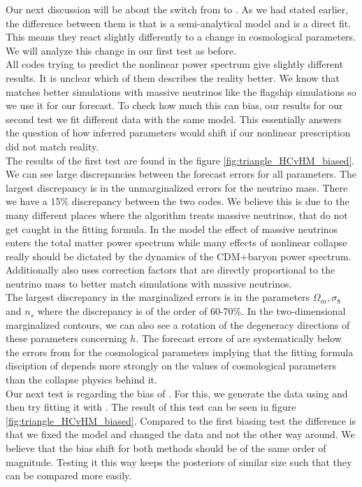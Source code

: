 \documentclass[../main.tex]{subfiles}
\begin{document}
\noindent Our next discussion will be about the switch from \halofit to \hmcode. As we had stated earlier, the difference between them is that \hmcode is a semi-analytical model and \halofit is a direct fit. This means they react slightly differently to a change in cosmological parameters. We will analyze this change in our first test as before.\\
All codes trying to predict the nonlinear power spectrum give slightly different results. It is unclear which of them describes the reality better. We know that \hmcode matches better simulations with massive neutrinos like the \Euclid flagship simulations so we use it for our forecast. To check how much this can bias, our results for our second test we fit different data with the same model. This essentially answers the question of how inferred parameters would shift if our nonlinear prescription did not match reality.\\
The results of the first test are found in the figure \ref{fig:triangle_HCvHM_biased}. We can see large discrepancies between the forecast errors for all parameters. The largest discrepancy is in the unmarginalized errors for the neutrino mass. There we have a  15\% discrepancy between the two codes. We believe this is due to the many different places where the \hmcode algorithm treats massive neutrinos, that do not get caught in the \halofit fitting formula. In the \halofit model the effect of massive neutrinos enters the total matter power spectrum while many effects of nonlinear collapse really should be dictated by the dynamics of the CDM+baryon power spectrum. Additionally \hmcode also uses correction factors that are directly proportional to the neutrino mass to better match simulations with massive neutrinos.\\
The largest discrepancy in the marginalized errors is in the parameters $\Omega_m,\sigma_8$ and $n_s$ where the discrepancy is of the order of 60-70\%. In the two-dimensional marginalized contours, we can also see a rotation of the degeneracy directions of these parameters concerning $h$. The forecast errors of \halofit are systematically below the errors from \hmcode for the cosmological parameters implying that the fitting formula disciption of \halofit depends more strongly on the values of cosmological parameters than the collapse physics behind it.\\
Our next test is regarding the bias of \hmcode. For this, we generate the data using \halofit and then try fitting it with \hmcode. The result of this test can be seen in figure \ref{fig:triangle_HCvHM_biased}. Compared to the first biasing test the difference is that we fixed the model and changed the data and not the other way around. We believe that the bias shift for both methods should be of the same order of magnitude. Testing it this way keeps the posteriors of similar size such that they can be compared more easily.\\
\end{document}
